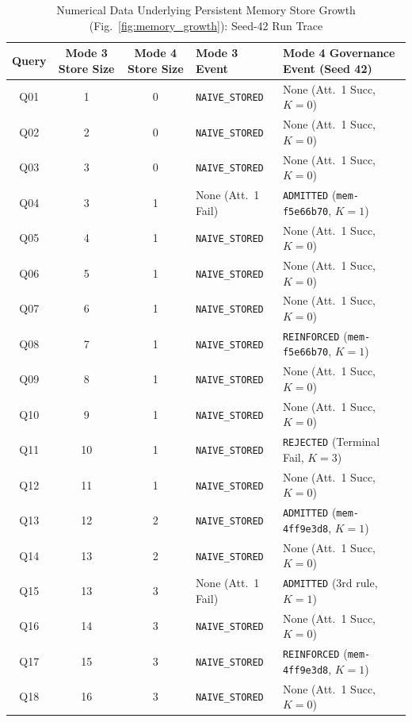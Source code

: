 \begin{table}[t]
\centering
\caption{Numerical Data Underlying Persistent Memory Store Growth (Fig.~\ref{fig:memory_growth}): Seed-42 Run Trace}
\label{tab:fig6_validation}
\footnotesize
\setlength{\tabcolsep}{0pt}
\renewcommand{\arraystretch}{1.03}
\begin{tabular*}{\textwidth}{@{\extracolsep{\fill}} c c c l l @{}}
\toprule
\textbf{Query} & \textbf{Mode 3 Store Size} & \textbf{Mode 4 Store Size} & \textbf{Mode 3 Event} & \textbf{Mode 4 Governance Event (Seed 42)} \\
\midrule
Q01 & 1 & 0 & \texttt{NAIVE\_STORED} & None (Att.~1 Succ, $K=0$) \\
Q02 & 2 & 0 & \texttt{NAIVE\_STORED} & None (Att.~1 Succ, $K=0$) \\
Q03 & 3 & 0 & \texttt{NAIVE\_STORED} & None (Att.~1 Succ, $K=0$) \\
Q04 & 3 & 1 & None (Att.~1 Fail) & \texttt{ADMITTED} (\texttt{mem-f5e66b70}, $K=1$) \\
Q05 & 4 & 1 & \texttt{NAIVE\_STORED} & None (Att.~1 Succ, $K=0$) \\
Q06 & 5 & 1 & \texttt{NAIVE\_STORED} & None (Att.~1 Succ, $K=0$) \\
Q07 & 6 & 1 & \texttt{NAIVE\_STORED} & None (Att.~1 Succ, $K=0$) \\
Q08 & 7 & 1 & \texttt{NAIVE\_STORED} & \texttt{REINFORCED} (\texttt{mem-f5e66b70}, $K=1$) \\
Q09 & 8 & 1 & \texttt{NAIVE\_STORED} & None (Att.~1 Succ, $K=0$) \\
Q10 & 9 & 1 & \texttt{NAIVE\_STORED} & None (Att.~1 Succ, $K=0$) \\
Q11 & 10 & 1 & \texttt{NAIVE\_STORED} & \texttt{REJECTED} (Terminal Fail, $K=3$) \\
Q12 & 11 & 1 & \texttt{NAIVE\_STORED} & None (Att.~1 Succ, $K=0$) \\
Q13 & 12 & 2 & \texttt{NAIVE\_STORED} & \texttt{ADMITTED} (\texttt{mem-4ff9e3d8}, $K=1$) \\
Q14 & 13 & 2 & \texttt{NAIVE\_STORED} & None (Att.~1 Succ, $K=0$) \\
Q15 & 13 & 3 & None (Att.~1 Fail) & \texttt{ADMITTED} (3rd rule, $K=1$) \\
Q16 & 14 & 3 & \texttt{NAIVE\_STORED} & None (Att.~1 Succ, $K=0$) \\
Q17 & 15 & 3 & \texttt{NAIVE\_STORED} & \texttt{REINFORCED} (\texttt{mem-4ff9e3d8}, $K=1$) \\
Q18 & 16 & 3 & \texttt{NAIVE\_STORED} & None (Att.~1 Succ, $K=0$) \\

\end{tabular*}
\end{table}
